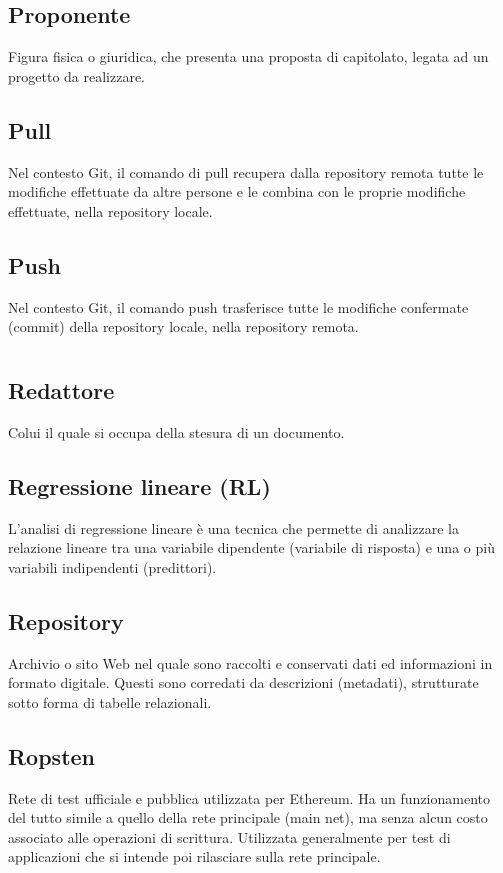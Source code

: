 	\subsection*{Proponente}
	Figura fisica o giuridica, che presenta una proposta di capitolato, legata ad un progetto da realizzare.
	\subsection*{Pull}
	Nel contesto Git, il comando di pull recupera dalla repository remota tutte le modifiche effettuate da altre persone e le combina con le proprie modifiche effettuate, nella repository locale.
	\subsection*{Push}
	Nel contesto Git, il comando push trasferisce tutte le modifiche confermate (commit) della repository locale, nella repository remota.
\pagebreak
\section{}
	\subsection*{Redattore}
	Colui il quale si occupa della stesura di un documento.
	\subsection*{Regressione lineare (RL)}
	L'analisi di regressione lineare è una tecnica che permette di analizzare la relazione lineare tra una variabile dipendente (variabile di risposta) e una o più variabili indipendenti (predittori).
	\subsection*{Repository}
	Archivio o sito Web nel quale sono raccolti e conservati dati ed informazioni in formato digitale. Questi sono corredati da descrizioni (metadati), strutturate sotto forma di tabelle relazionali.
	\subsection*{Ropsten}
	Rete di test ufficiale e pubblica utilizzata per Ethereum. Ha un funzionamento del tutto simile a quello della rete principale (main net), ma senza alcun costo associato alle operazioni di scrittura. Utilizzata generalmente per test di applicazioni che si intende poi rilasciare sulla rete principale.
\pagebreak

